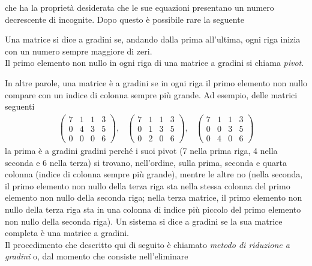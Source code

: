 che ha la proprietà desiderata che le sue equazioni presentano un numero
decrescente di incognite.
Dopo questo è possibile rare la seguente
\begin{defi}
  \label{defi:gauss-jorda1}
  Una matrice si dice a gradini se, andando dalla prima all'ultima,
  ogni riga inizia con un numero sempre maggiore di zeri.\\
  Il primo elemento non nullo in ogni riga di una matrice a gradini si
  chiama \textit{pivot}.
\end{defi}
In altre parole, una matrice è a gradini se in ogni riga il primo elemento
non nullo compare con un indice di colonna sempre più grande. Ad esempio,
delle matrici seguenti
\begin{eqnarray*}
  \begin{pmatrix}
    7 & 1 & 1 & 3\\
    0 & 4 & 3 & 5\\
    0 & 0 & 0 & 6
  \end{pmatrix}, &
                   \begin{pmatrix}
                     7 & 1 & 1 & 3\\
                     0 & 1 & 3 & 5\\
                     0 & 2 & 0 & 6
                   \end{pmatrix}, &
                                   \begin{pmatrix}
                                     7 & 1 & 1 & 3\\
                                     0 & 0 & 3 & 5\\
                                     0 & 4 & 0 & 6
                                   \end{pmatrix}
\end{eqnarray*}
la prima è a gradini gradini perché i suoi pivot (7 nella prima riga,
4 nella seconda e 6 nella terza) si trovano, nell'ordine, sulla prima,
seconda e quarta colonna (indice di colonna sempre più grande), mentre
le altre no (nella seconda, il primo elemento non nullo della terza riga
sta nella stessa colonna del primo elemento non nullo della seconda riga;
nella terza matrice, il primo elemento non nullo della terza riga sta in
una colonna di indice più piccolo del primo elemento non nullo della
seconda riga). Un sistema si dice a gradini se la sua matrice completa è
una matrice a gradini.\\
Il procedimento che descritto qui di seguito è chiamato \textit{metodo
  di riduzione a gradini} o, dal momento che consiste nell'eliminare

